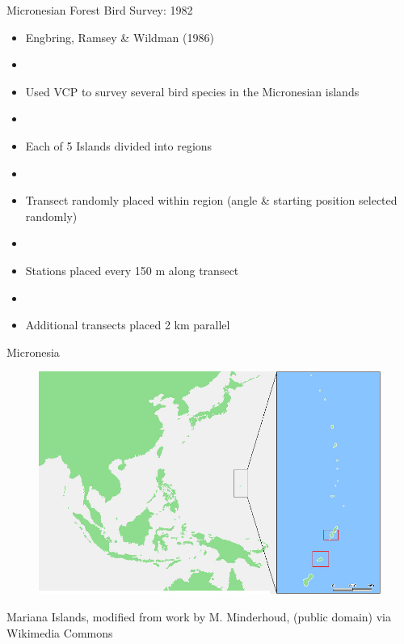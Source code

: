 \documentclass{beamer}
\begin{document}
\begin{frame}{Micronesian Forest Bird Survey: 1982}
\begin{itemize}
\item Engbring, Ramsey \& Wildman (1986)
\item[]
\item Used VCP to survey several bird species in the Micronesian islands
\item[]
\item Each of 5 Islands divided into regions
\item[]
\item Transect randomly placed within region (angle \& starting position selected randomly)
\item[]
\item Stations placed every 150 m along transect
\item[]
\item Additional transects placed 2 km parallel
\end{itemize}

\end{frame}

\begin{frame}{Micronesia}
	\begin{figure}
		\centering
		\includegraphics[height=.80\textheight]{../images/islands.jpg}
	\end{figure}
	\tiny
	\begin{center}\color{OSUdkbrn}
	Mariana Islands, modified from work by M. Minderhoud, (public domain) via  Wikimedia Commons
	\end{center}

\end{frame}
\end{document}
